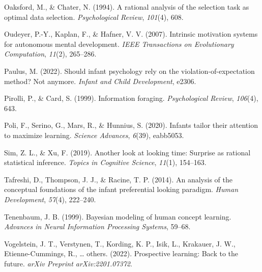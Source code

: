 \documentclass[10pt, letterpaper]{article}
\newenvironment{CSLReferences}%
  {}%
  {\par}
\begin{document}
\begin{CSLReferences}{1}{0}
\leavevmode{}%
Oaksford, M., \& Chater, N. (1994). A rational analysis of the selection
task as optimal data selection. \emph{Psychological Review},
\emph{101}(4), 608.

\leavevmode{}%
Oudeyer, P.-Y., Kaplan, F., \& Hafner, V. V. (2007). Intrinsic
motivation systems for autonomous mental development. \emph{IEEE
Transactions on Evolutionary Computation}, \emph{11}(2), 265--286.

\leavevmode{}%
Paulus, M. (2022). Should infant psychology rely on the
violation-of-expectation method? Not anymore. \emph{Infant and Child
Development}, e2306.

\leavevmode{}%
Pirolli, P., \& Card, S. (1999). Information foraging.
\emph{Psychological Review}, \emph{106}(4), 643.

\leavevmode{}%
Poli, F., Serino, G., Mars, R., \& Hunnius, S. (2020). Infants tailor
their attention to maximize learning. \emph{Science Advances},
\emph{6}(39), eabb5053.

\leavevmode{}%
Sim, Z. L., \& Xu, F. (2019). Another look at looking time: Surprise as
rational statistical inference. \emph{Topics in Cognitive Science},
\emph{11}(1), 154--163.

\leavevmode{}%
Tafreshi, D., Thompson, J. J., \& Racine, T. P. (2014). An analysis of
the conceptual foundations of the infant preferential looking paradigm.
\emph{Human Development}, \emph{57}(4), 222--240.

\leavevmode{}%
Tenenbaum, J. B. (1999). Bayesian modeling of human concept learning.
\emph{Advances in Neural Information Processing Systems}, 59--68.

\leavevmode{}%
Vogelstein, J. T., Verstynen, T., Kording, K. P., Isik, L., Krakauer, J.
W., Etienne-Cummings, R., \ldots{} others. (2022). Prospective learning:
Back to the future. \emph{arXiv Preprint arXiv:2201.07372}.

\end{CSLReferences}


\end{document}
